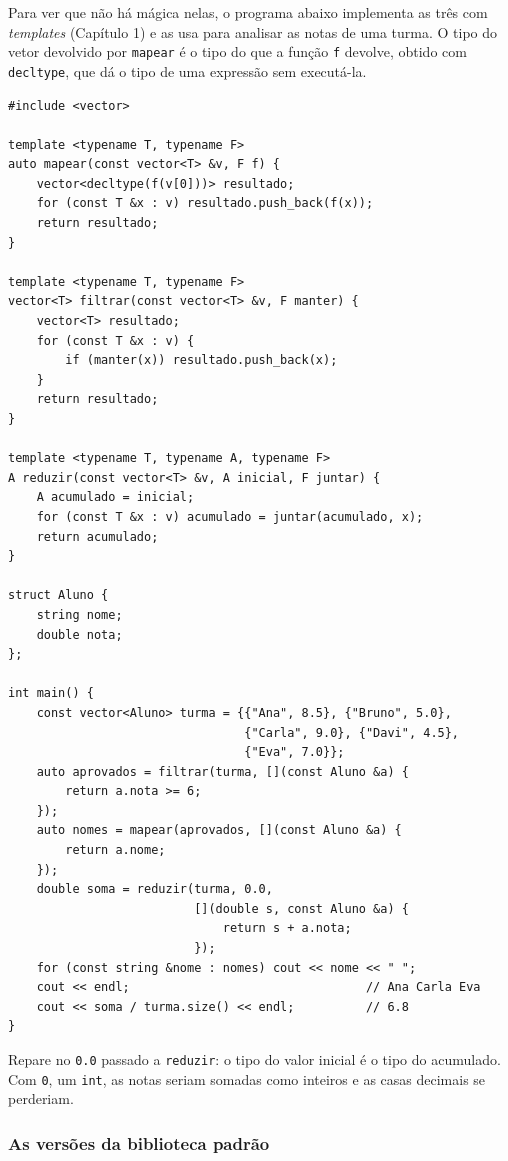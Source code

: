 Para ver que não há mágica nelas, o programa abaixo implementa as três com \textit{templates} (Capítulo 1) e as usa para analisar as notas de uma turma. O tipo do vetor devolvido por \texttt{mapear} é o tipo do que a função \texttt{f} devolve, obtido com \texttt{decltype}, que dá o tipo de uma expressão sem executá-la.

\begin{codigo}
\begin{Verbatim}[breaklines=true, breaksymbolleft={}, fontsize=\footnotesize]
#include <vector>

template <typename T, typename F>
auto mapear(const vector<T> &v, F f) {
    vector<decltype(f(v[0]))> resultado;
    for (const T &x : v) resultado.push_back(f(x));
    return resultado;
}

template <typename T, typename F>
vector<T> filtrar(const vector<T> &v, F manter) {
    vector<T> resultado;
    for (const T &x : v) {
        if (manter(x)) resultado.push_back(x);
    }
    return resultado;
}

template <typename T, typename A, typename F>
A reduzir(const vector<T> &v, A inicial, F juntar) {
    A acumulado = inicial;
    for (const T &x : v) acumulado = juntar(acumulado, x);
    return acumulado;
}

struct Aluno {
    string nome;
    double nota;
};

int main() {
    const vector<Aluno> turma = {{"Ana", 8.5}, {"Bruno", 5.0},
                                 {"Carla", 9.0}, {"Davi", 4.5},
                                 {"Eva", 7.0}};
    auto aprovados = filtrar(turma, [](const Aluno &a) {
        return a.nota >= 6;
    });
    auto nomes = mapear(aprovados, [](const Aluno &a) {
        return a.nome;
    });
    double soma = reduzir(turma, 0.0,
                          [](double s, const Aluno &a) {
                              return s + a.nota;
                          });
    for (const string &nome : nomes) cout << nome << " ";
    cout << endl;                                 // Ana Carla Eva
    cout << soma / turma.size() << endl;          // 6.8
}
\end{Verbatim}
\end{codigo}

Repare no \texttt{0.0} passado a \texttt{reduzir}: o tipo do valor inicial é o tipo do acumulado. Com \texttt{0}, um \texttt{int}, as notas seriam somadas como inteiros e as casas decimais se perderiam.

\subsubsection{As versões da biblioteca padrão}


